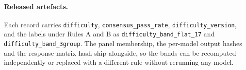 \paragraph{Released artefacts.}
Each record carries \texttt{difficulty}, \texttt{consensus\_pass\_rate},
\texttt{difficulty\_version}, and the labels under Rules A and B as
\texttt{difficulty\_band\_flat\_17} and \texttt{difficulty\_band\_3group}. The panel membership,
the per-model output hashes and the response-matrix hash ship alongside, so the bands can be
recomputed independently or replaced with a different rule without rerunning any model.

